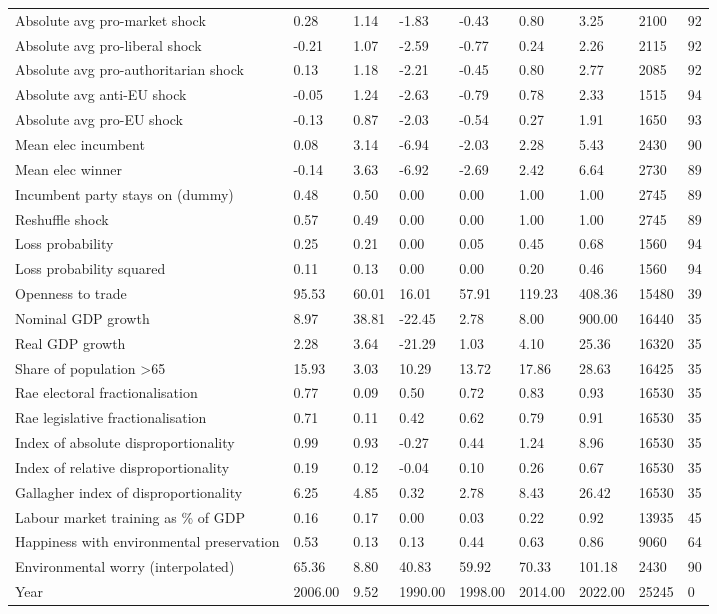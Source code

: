 \begin{longtable}{lllllllll}
\addlinespace
Absolute avg pro-market shock & 0.28 & 1.14 & -1.83 & -0.43 & 0.80 & 3.25 & 2100 & 92\\
Absolute avg pro-liberal shock & -0.21 & 1.07 & -2.59 & -0.77 & 0.24 & 2.26 & 2115 & 92\\
Absolute avg pro-authoritarian shock & 0.13 & 1.18 & -2.21 & -0.45 & 0.80 & 2.77 & 2085 & 92\\
Absolute avg anti-EU shock & -0.05 & 1.24 & -2.63 & -0.79 & 0.78 & 2.33 & 1515 & 94\\
Absolute avg pro-EU shock & -0.13 & 0.87 & -2.03 & -0.54 & 0.27 & 1.91 & 1650 & 93\\
\addlinespace
Mean elec incumbent & 0.08 & 3.14 & -6.94 & -2.03 & 2.28 & 5.43 & 2430 & 90\\
Mean elec winner & -0.14 & 3.63 & -6.92 & -2.69 & 2.42 & 6.64 & 2730 & 89\\
Incumbent party stays on (dummy) & 0.48 & 0.50 & 0.00 & 0.00 & 1.00 & 1.00 & 2745 & 89\\
Reshuffle shock & 0.57 & 0.49 & 0.00 & 0.00 & 1.00 & 1.00 & 2745 & 89\\
Loss probability & 0.25 & 0.21 & 0.00 & 0.05 & 0.45 & 0.68 & 1560 & 94\\
\addlinespace
Loss probability squared & 0.11 & 0.13 & 0.00 & 0.00 & 0.20 & 0.46 & 1560 & 94\\
Openness to trade & 95.53 & 60.01 & 16.01 & 57.91 & 119.23 & 408.36 & 15480 & 39\\
Nominal GDP growth & 8.97 & 38.81 & -22.45 & 2.78 & 8.00 & 900.00 & 16440 & 35\\
Real GDP growth & 2.28 & 3.64 & -21.29 & 1.03 & 4.10 & 25.36 & 16320 & 35\\
Share of population >65 & 15.93 & 3.03 & 10.29 & 13.72 & 17.86 & 28.63 & 16425 & 35\\
\addlinespace
Rae electoral fractionalisation & 0.77 & 0.09 & 0.50 & 0.72 & 0.83 & 0.93 & 16530 & 35\\
Rae legislative fractionalisation & 0.71 & 0.11 & 0.42 & 0.62 & 0.79 & 0.91 & 16530 & 35\\
Index of absolute disproportionality & 0.99 & 0.93 & -0.27 & 0.44 & 1.24 & 8.96 & 16530 & 35\\
Index of relative disproportionality & 0.19 & 0.12 & -0.04 & 0.10 & 0.26 & 0.67 & 16530 & 35\\
Gallagher index of disproportionality & 6.25 & 4.85 & 0.32 & 2.78 & 8.43 & 26.42 & 16530 & 35\\
\addlinespace
Labour market training as \% of GDP & 0.16 & 0.17 & 0.00 & 0.03 & 0.22 & 0.92 & 13935 & 45\\
Happiness with environmental preservation & 0.53 & 0.13 & 0.13 & 0.44 & 0.63 & 0.86 & 9060 & 64\\
Environmental worry (interpolated) & 65.36 & 8.80 & 40.83 & 59.92 & 70.33 & 101.18 & 2430 & 90\\
Year & 2006.00 & 9.52 & 1990.00 & 1998.00 & 2014.00 & 2022.00 & 25245 & 0\\
\bottomrule
\end{longtable}
